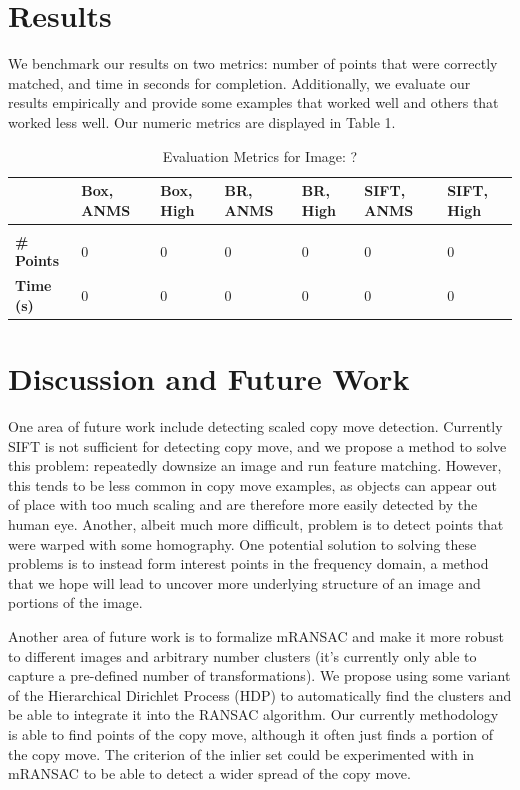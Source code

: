 \documentclass[12pt]{article}
\begin{document}
\section*{Results}

We benchmark our results on two metrics: number of points that were correctly matched, and time in seconds for completion. Additionally, we evaluate our results empirically and provide some examples that worked well and others that worked less well. Our numeric metrics are displayed in Table 1. 

\begin{table}[t]
\caption{Evaluation Metrics for Image: ?}
\label{image}
\begin{center}
\begin{tabular}{l|llllll}
\multicolumn{1}{l}{} & \multicolumn{1}{l}{\bf Box, ANMS} & \multicolumn{1}{l}{\bf Box, High} & \multicolumn{1}{l}{\bf BR, ANMS} & \multicolumn{1}{l}{\bf BR, High} & \multicolumn{1}{l}{\bf SIFT, ANMS} & \multicolumn{1}{l}{\bf SIFT, High}
\\ \hline \\
{\bf \# Points} & 0 & 0 & 0 & 0 & 0 & 0 \\
{\bf Time (s)} & 0 & 0 & 0 & 0 & 0 & 0 \\
\end{tabular}
\end{center}
\end{table}

\section*{Discussion and Future Work}

One area of future work include detecting scaled copy move detection. Currently SIFT is not sufficient for detecting copy move, and we propose a method to solve this problem: repeatedly downsize an image and run feature matching. However, this tends to be less common in copy move examples, as objects can appear out of place with too much scaling and are therefore more easily detected by the human eye. Another, albeit much more difficult, problem is to detect points that were warped with some homography. One potential solution to solving these problems is to instead form interest points in the frequency domain, a method that we hope will lead to uncover more underlying structure of an image and portions of the image. 

Another area of future work is to formalize mRANSAC and make it more robust to different images and arbitrary number clusters (it's currently only able to capture a pre-defined number of transformations). We propose using some variant of the Hierarchical Dirichlet Process (HDP) to automatically find the clusters and be able to integrate it into the RANSAC algorithm. Our currently methodology is able to find points of the copy move, although it often just finds a portion of the copy move. The criterion of the inlier set could be experimented with in mRANSAC to be able to detect a wider spread of the copy move.
\end{document}
